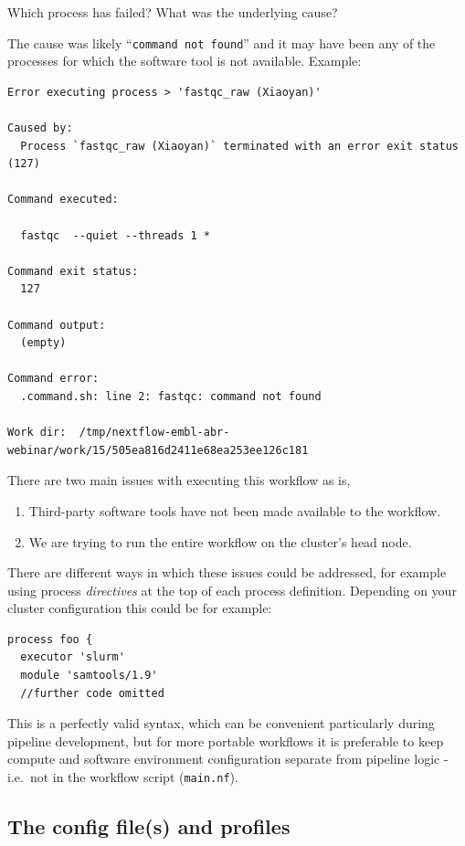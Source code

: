 \begin{questions}
Which process has failed?
What was the underlying cause?
\begin{answer}
The cause was likely ``\texttt{command not found}'' and it may have been any of the processes for which the software tool is not available.
Example:
\begin{lstlisting}
Error executing process > 'fastqc_raw (Xiaoyan)'

Caused by:
  Process `fastqc_raw (Xiaoyan)` terminated with an error exit status (127)

Command executed:

  fastqc  --quiet --threads 1 *

Command exit status:
  127

Command output:
  (empty)

Command error:
  .command.sh: line 2: fastqc: command not found

Work dir:  /tmp/nextflow-embl-abr-webinar/work/15/505ea816d2411e68ea253ee126c181
\end{lstlisting}
\end{answer}
\end{questions}


There are two main issues with executing this workflow as is, 
\begin{enumerate}
 \item Third-party software tools have not been made available to the workflow.
 \item We are trying to run the entire workflow on the cluster's head node.
\end{enumerate}

There are different ways in which these issues could be addressed, for example using process 
\emph{directives} at the top of each process definition. 
Depending on your cluster configuration this could be for example:
\begin{lstlisting}
process foo {
  executor 'slurm' 
  module 'samtools/1.9' 
  //further code omitted 
\end{lstlisting}

This is a perfectly valid syntax, which can be convenient particularly during pipeline development, 
but for more portable workflows it is preferable to keep compute and software environment configuration 
separate from pipeline logic - i.e.\ not in the workflow script (\texttt{main.nf}).

\subsection{The config file(s) and profiles}

